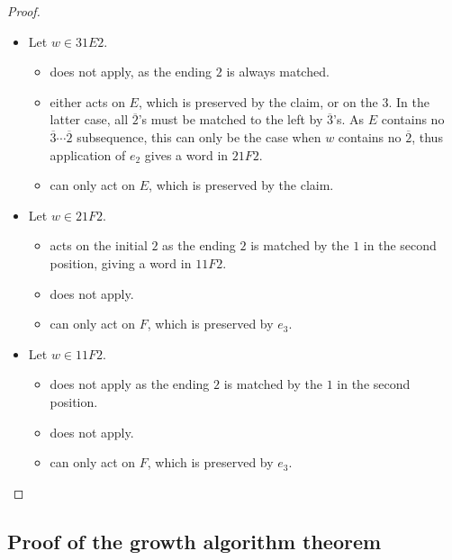 \documentclass{amsart}
\theoremstyle{definition}
\theoremstyle{remark}
\numberwithin{equation}{section}
\begin{document}
\begin{proof}
\begin{itemize}
    \begin{itemize}
        \item[$e_1$:] does not apply.
        \item[$e_2$:] acts on the ending $3$ as $w$ does not contain a $2$ or a $\overline{3}$ that could match it, giving a word in $31D2\subset 31E2$. 
        \item[$e_3$:] does not apply.
    \end{itemize}
    \item Let $w\in 31E2$.
    \begin{itemize}
        \item[$e_1$:] does not apply, as the ending $2$ is always matched.
        \item[$e_2$:] either acts on $E$, which is preserved by the claim, or on the $3$. In the latter case, all $\overline{2}$'s must be matched to the left by $\overline{3}$'s. As $E$ contains no $\overline{3}\cdots\overline{2}$ subsequence, this can only be the case when $w$ contains no $\overline{2}$, thus application of $e_2$ gives a word in $21F2$.
        \item[$e_3$:] can only act on $E$, which is preserved by the claim.
    \end{itemize}
    \item Let $w\in 21F2$.
    \begin{itemize}
        \item[$e_1$:] acts on the initial $2$ as the ending $2$ is matched by the $1$ in the second position, giving a word in $11F2$.
        \item[$e_2$:] does not apply.
        \item[$e_3$:] can only act on $F$, which is preserved by $e_3$.
    \end{itemize}
    \item Let $w\in 11F2$.
    \begin{itemize}
        \item[$e_1$:] does not apply as the ending $2$ is matched by the $1$ in the second position.
        \item[$e_2$:] does not apply.
        \item[$e_3$:] can only act on $F$, which is preserved by $e_3$. \qedhere
    \end{itemize}
\end{itemize}
\end{proof}

\subsection{Proof of the growth algorithm theorem}\label{sec:growth-theorem-proof}
\end{document}
